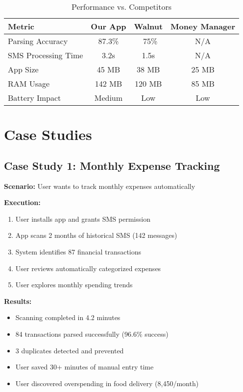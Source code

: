\documentclass[11pt,a4paper]{report}
\begin{document}
\begin{itemize}
\begin{itemize}
\begin{table}[H]
\centering
\caption{Performance vs. Competitors}
\begin{tabular}{|l|c|c|c|}
\hline
\textbf{Metric} & \textbf{Our App} & \textbf{Walnut} & \textbf{Money Manager} \\
\hline
Parsing Accuracy & 87.3\% & ~75\% & N/A \\
SMS Processing Time & 3.2s & 1.5s & N/A \\
App Size & 45 MB & 38 MB & 25 MB \\
RAM Usage & 142 MB & 120 MB & 85 MB \\
Battery Impact & Medium & Low & Low \\
\hline
\end{tabular}
\end{table}

\section{Case Studies}

\subsection{Case Study 1: Monthly Expense Tracking}

\textbf{Scenario:} User wants to track monthly expenses automatically

\textbf{Execution:}
\begin{enumerate}
    \item User installs app and grants SMS permission
    \item App scans 2 months of historical SMS (142 messages)
    \item System identifies 87 financial transactions
    \item User reviews automatically categorized expenses
    \item User explores monthly spending trends
\end{enumerate}

\textbf{Results:}
\begin{itemize}
    \item Scanning completed in 4.2 minutes
    \item 84 transactions parsed successfully (96.6\% success)
    \item 3 duplicates detected and prevented
    \item User saved 30+ minutes of manual entry time
    \item User discovered overspending in food delivery (8,450/month)
\end{itemize}


\end{itemize}
\end{itemize}
\end{document}
